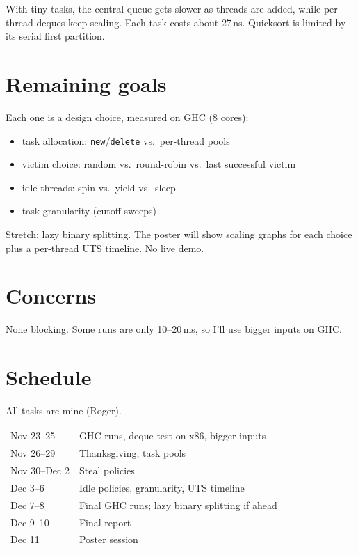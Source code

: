 \documentclass[11pt]{article}
\begin{document}
\noindent With tiny tasks, the central queue gets slower as threads are added, while
per-thread deques keep scaling. Each task costs about 27\,ns. Quicksort is limited
by its serial first partition.

\section*{Remaining goals}
Each one is a design choice, measured on GHC (8 cores):
\begin{itemize}
  \item task allocation: \texttt{new}/\texttt{delete} vs.\ per-thread pools
  \item victim choice: random vs.\ round-robin vs.\ last successful victim
  \item idle threads: spin vs.\ yield vs.\ sleep
  \item task granularity (cutoff sweeps)
\end{itemize}
Stretch: lazy binary splitting. The poster will show scaling graphs for each choice
plus a per-thread UTS timeline. No live demo.

\section*{Concerns}
None blocking. Some runs are only 10--20\,ms, so I'll use bigger inputs on GHC.

\section*{Schedule}
All tasks are mine (Roger).

\medskip
\begin{tabular}{@{}ll@{}}
\toprule
Nov 23--25    & GHC runs, deque test on x86, bigger inputs \\
Nov 26--29    & Thanksgiving; task pools \\
Nov 30--Dec 2 & Steal policies \\
Dec 3--6      & Idle policies, granularity, UTS timeline \\
Dec 7--8      & Final GHC runs; lazy binary splitting if ahead \\
Dec 9--10     & Final report \\
Dec 11        & Poster session \\
\bottomrule
\end{tabular}
\end{document}

